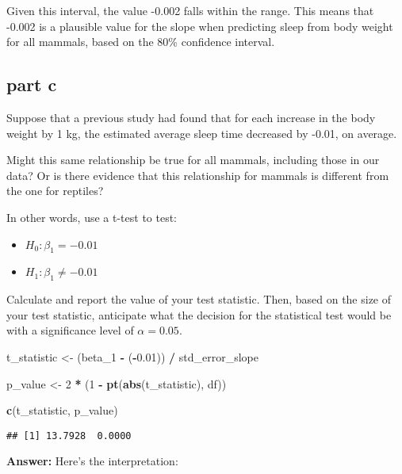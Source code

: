 \documentclass[
]{article}
\newenvironment{Shaded}{\begin{snugshade}}{\end{snugshade}}
\newcommand{\DecValTok}[1]{\textcolor[rgb]{0.00,0.00,0.81}{#1}}
\newcommand{\FloatTok}[1]{\textcolor[rgb]{0.00,0.00,0.81}{#1}}
\newcommand{\FunctionTok}[1]{\textcolor[rgb]{0.13,0.29,0.53}{\textbf{#1}}}
\newcommand{\NormalTok}[1]{#1}
\newcommand{\OtherTok}[1]{\textcolor[rgb]{0.56,0.35,0.01}{#1}}
\newcommand{\SpecialCharTok}[1]{\textcolor[rgb]{0.81,0.36,0.00}{\textbf{#1}}}
\providecommand{\tightlist}{%
  \setlength{\itemsep}{0pt}\setlength{\parskip}{0pt}}
\begin{document}
Given this interval, the value -0.002 falls within the range. This means
that -0.002 is a plausible value for the slope when predicting sleep
from body weight for all mammals, based on the 80\% confidence interval.

\subsection{part c}\label{part-c-2}

Suppose that a previous study had found that for each increase in the
body weight by 1 kg, the estimated average sleep time decreased by
-0.01, on average.

Might this same relationship be true for all mammals, including those in
our data? Or is there evidence that this relationship for mammals is
different from the one for reptiles?

In other words, use a t-test to test:

\begin{itemize}
\tightlist
\item
  \(H_0: \beta_1 = -0.01\)
\item
  \(H_1: \beta_1 \neq -0.01\)
\end{itemize}

Calculate and report the value of your test statistic. Then, based on
the size of your test statistic, anticipate what the decision for the
statistical test would be with a significance level of
\(\alpha = 0.05\).

\begin{Shaded}
\begin{Highlighting}[]
\NormalTok{t\_statistic }\OtherTok{\textless{}{-}}\NormalTok{ (beta\_1 }\SpecialCharTok{{-}}\NormalTok{ (}\SpecialCharTok{{-}}\FloatTok{0.01}\NormalTok{)) }\SpecialCharTok{/}\NormalTok{ std\_error\_slope}

\NormalTok{p\_value }\OtherTok{\textless{}{-}} \DecValTok{2} \SpecialCharTok{*}\NormalTok{ (}\DecValTok{1} \SpecialCharTok{{-}} \FunctionTok{pt}\NormalTok{(}\FunctionTok{abs}\NormalTok{(t\_statistic), df))}

\FunctionTok{c}\NormalTok{(t\_statistic, p\_value)}
\end{Highlighting}
\end{Shaded}

\begin{verbatim}
## [1] 13.7928  0.0000
\end{verbatim}

\textbf{Answer:} Here's the interpretation:
\end{document}
